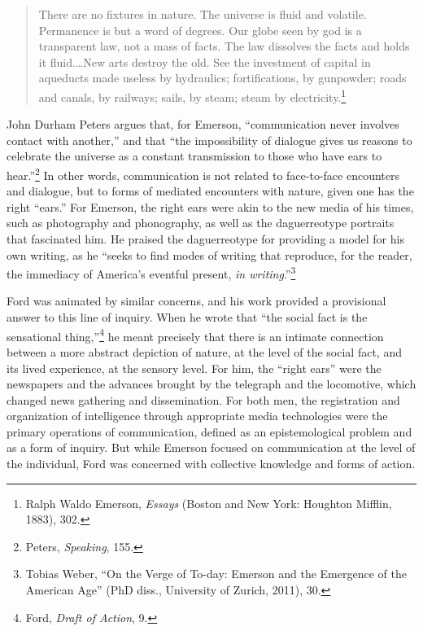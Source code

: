 \documentclass[openany,nobib]{tufte-book}
\begin{document}
\begin{quote}
There are no fixtures in nature. The universe is fluid and volatile.
Permanence is but a word of degrees. Our globe seen by god is a
transparent law, not a mass of facts. The law dissolves the facts and
holds it fluid.\ldots New arts destroy the old. See the investment of
capital in aqueducts made useless by hydraulics; fortifications, by
gunpowder; roads and canals, by railways; sails, by steam; steam by
electricity.\footnote{Ralph Waldo Emerson, \emph{Essays} (Boston and New
  York: Houghton Mifflin, 1883), 302.}
\end{quote}

\noindent John Durham Peters argues that, for Emerson, ``communication never
involves contact with another,'' and that ``the impossibility of
dialogue gives us reasons to celebrate the universe as a constant
transmission to those who have ears to hear.''\footnote{Peters,
  \emph{Speaking}, 155.} In other words, communication is not related to
face-to-face encounters and dialogue, but to forms of mediated
encounters with nature, given one has the right ``ears.'' For Emerson,
the right ears were akin to the new media of his times, such as
photography and phonography, as well as the daguerreotype portraits that
fascinated him. He praised the daguerreotype for providing a model for
his own writing, as he ``seeks to find modes of writing that reproduce,
for the reader, the immediacy of America's eventful present, \emph{in
writing}.''\footnote{Tobias Weber, ``On the Verge of To-day: Emerson and
  the Emergence of the American Age'' (PhD diss., University of Zurich,
  2011), 30.}

Ford was animated by similar concerns, and his work provided a
provisional answer to this line of inquiry. When he wrote that ``the
social fact is the sensational thing,''\footnote{Ford, \emph{Draft of
  Action}, 9.} he meant precisely that there is an intimate connection
between a more abstract depiction of nature, at the level of the social
fact, and its lived experience, at the sensory level. For him, the
``right ears'' were the newspapers and the advances brought by the
telegraph and the locomotive, which changed news gathering and
dissemination. For both men, the registration and organization of
intelligence through appropriate media technologies were the primary
operations of communication, defined as an epistemological problem and
as a form of inquiry. But while Emerson focused on communication at the
level of the individual, Ford was concerned with collective knowledge
and forms of action.
\end{document}
